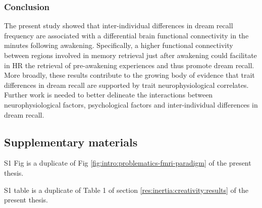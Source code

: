 \subsubsection{Conclusion}
The present study showed that inter-individual differences in dream recall frequency are associated with a differential brain functional connectivity in the minutes following awakening. Specifically, a higher functional connectivity between regions involved in memory retrieval just after awakening could facilitate in HR the retrieval of pre-awakening experiences and thus promote dream recall. More broadly, these results contribute to the growing body of evidence that trait differences in dream recall are supported by trait neurophysiological correlates. Further work is needed to better delineate the interactions between neurophysiological factors, psychological factors and inter-individual differences in dream recall.

%

\FloatBarrier

\subsection*{Supplementary materials}

S1 Fig is a duplicate of Fig \ref{fig:intro:problematics-fmri-paradigm} of the present thesis.

S1 table is a duplicate of Table 1 of section \ref{res:inertia:creativity:results} of the present thesis.

\vspace*{1cm}

